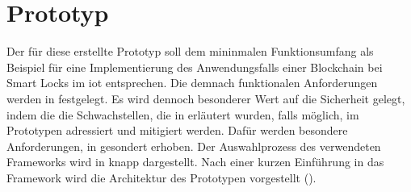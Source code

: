 \section{Prototyp}
\label{sec:prototype}
    Der für diese erstellte Prototyp soll dem mininmalen Funktionsumfang als Beispiel für eine Implementierung des Anwendungsfalls einer Blockchain bei Smart Locks im \gls{iot} entsprechen. 
    Die demnach funktionalen Anforderungen werden in  festgelegt. 
    Es wird dennoch besonderer Wert auf die Sicherheit gelegt, indem die die Schwachstellen, die in  erläutert wurden, falls möglich, im Prototypen adressiert und mitigiert werden. 
    Dafür werden besondere Anforderungen, in  gesondert erhoben. 
    Der Auswahlprozess des verwendeten Frameworks wird in  knapp dargestellt. 
    Nach einer kurzen Einführung in das Framework wird die Architektur des Prototypen vorgestellt (). 
